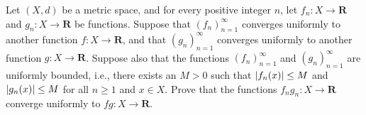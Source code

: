 \begin{exercise}\label{ex 3.3.8}
    Let \((X, d)\) be a metric space, and for every positive integer \(n\), let \(f_n : X \to \mathbf{R}\) and \(g_n : X \to \mathbf{R}\) be functions.
    Suppose that \((f_n)_{n = 1}^\infty\) converges uniformly to another function \(f : X \to \mathbf{R}\), and that \((g_n)_{n = 1}^\infty\) converges uniformly to another function \(g : X \to \mathbf{R}\).
    Suppose also that the functions \((f_n)_{n = 1}^\infty\) and \((g_n)_{n = 1}^\infty\) are uniformly bounded, i.e., there exists an \(M > 0\) such that \(\abs*{f_n(x)} \leq M\) and \(\abs*{g_n(x)} \leq M\) for all \(n \geq 1\) and \(x \in X\).
    Prove that the functions \(f_n g_n : X \to \mathbf{R}\) converge uniformly to \(fg : X \to \mathbf{R}\).
\end{exercise}